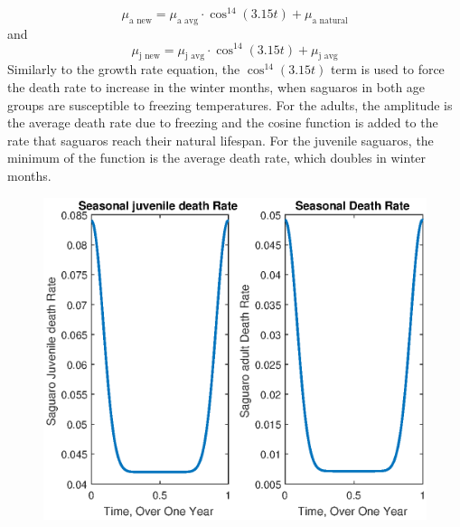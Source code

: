 \documentclass[a4paper]{article}
\begin{document}
\begin{equation*}
\mu_{\text{a new}} = \mu_{\text{a avg}}\cdot \cos^{14}(3.15t) + \mu_{\text{a natural}}
\end{equation*}
and
\begin{equation*}
\mu_{\text{j new}} = \mu_{\text{j avg}}\cdot \cos^{14}(3.15t) + \mu_{\text{j avg}}
\end{equation*}
Similarly to the growth rate equation, the $\cos^{14}(3.15t)$ term is used to force the death rate to increase in the winter months, when saguaros in both age groups are susceptible to freezing temperatures. For the adults, the amplitude is the average death rate due to freezing and the cosine function is added to the rate that saguaros reach their natural lifespan. For the juvenile saguaros, the minimum of the function is the average death rate, which doubles in winter months.
\begin{figure}[H]
\centering
\includegraphics[scale=0.7]{SeasonalDeath.eps}
\end{figure}
\end{document}
